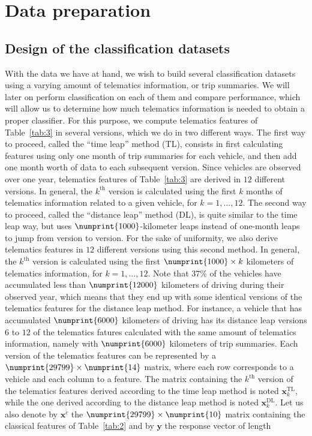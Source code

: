 \documentclass{article}
\begin{document}
\section{Data preparation}\label{sec:preprocessing}

\subsection{Design of the classification datasets}

With the data we have at hand, we wish to build several classification datasets using a varying amount of telematics information, or trip summaries. We will later on perform classification on each of them and compare performance, which will allow us to determine how much telematics information is needed to obtain a proper classifier. For this purpose, we compute telematics features of Table~\ref{tab:3} in several versions, which we do in two different ways. The first way to proceed, called the ``time leap'' method (TL), consists in first calculating features using only one month of trip summaries for each vehicle, and then add one month worth of data to each subsequent version. Since vehicles are observed over one year, telematics features of Table~\ref{tab:3} are derived in $12$ different versions. In general, the $k^\text{th}$ version is calculated using the first $k$ months of telematics information related to a given vehicle, for $k = 1, \dots, 12$. The second way to proceed, called the ``distance leap'' method (DL), is quite similar to the time leap way, but uses $\numprint{1000}$-kilometer leaps instead of one-month leaps to jump from version to version. For the sake of uniformity, we also derive telematics features in $12$ different versions using this second method. In general, the $k^\text{th}$ version is calculated using the first $\numprint{1000}\times k$ kilometers of telematics information, for $k = 1, \dots, 12$. Note that $37$\% of the vehicles have accumulated less than $\numprint{12000}$ kilometers of driving during their observed year, which means that they end up with some identical versions of the telematics features for the distance leap method. For instance, a vehicle that has accumulated $\numprint{6000}$ kilometers of driving has its distance leap versions $6$ to $12$ of the telematics fatures calculated with the same amount of telematics information, namely with $\numprint{6000}$ kilometers of trip summaries. Each version of the telematics features can be represented by a $\numprint{29799} \times \numprint{14}$ matrix, where each row corresponds to a vehicle and each column to a feature. The matrix containing the $k^\text{th}$ version of the telematics features derived according to the time leap method is noted $\boldsymbol{x}_k^\text{TL}$, while the one derived according to the distance leap method is noted $\boldsymbol{x}_k^\text{DL}$. Let us also denote by $\boldsymbol{x}^c$ the $\numprint{29799} \times \numprint{10}$ matrix containing the classical features of Table~\ref{tab:2} and by $\boldsymbol{y}$ the response vector of length 
\end{document}
